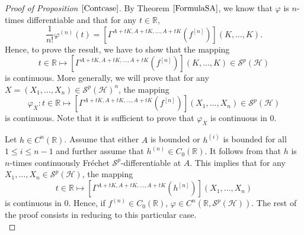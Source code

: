 \documentclass[12pt]{amsart}
\theoremstyle{remark}
\renewcommand{\H}{\mbox{${\mathcal H}$}}
\def\Sc{{\mathcal{S}}}
\begin{document}
\begin{proof}[Proof of Proposition $\ref{Contcase}$]
By Theorem $\ref{FormulaSA}$, we know that $\varphi$ is $n$-times differentiable and that for any $t\in \mathbb{R}$,
\begin{equation*}
\dfrac{1}{n!} \varphi^{(n)}(t) = \left[ \Gamma^{A+tK, A+tK, \ldots, A+tK}(f^{[n]}) \right] (K, \ldots, K).
\end{equation*}
Hence, to prove the result, we have to show that the mapping
$$
t \in \mathbb{R} \mapsto \left[ \Gamma^{A+tK, A+tK, \ldots, A+tK}(f^{[n]}) \right] (K, \ldots, K) \in \mathcal{S}^p(\mathcal{H})
$$
is continuous. More generally, we will prove that for any $X = (X_1, \ldots, X_n) \in \mathcal{S}^p(\mathcal{H})^n$, the mapping
$$
\varphi_X : t \in \mathbb{R} \mapsto \left[ \Gamma^{A+tK, A+tK, \ldots, A+tK}(f^{[n]}) \right] (X_1, \ldots, X_n) \in \mathcal{S}^p(\mathcal{H})
$$
is continuous. Note that it is sufficient to prove that $\varphi_X$ is continuous in $0$.

Let $h \in C^n(\mathbb{R})$.  Assume that either $A$ is bounded or $h^{(i)}$ is bounded for all $1\leq i\leq n-1$ and further assume that $h^{(n)} \in C_0(\mathbb{R})$. It follows from \cite[Theorem 3.4]{LMS} that $h$ is $n$-times continuously Fr\'echet $\mathcal{S}^p$-differentiable at $A$. This implies that for any $X_1, \ldots, X_n \in \mathcal{S}^p(\mathcal{H})$, the mapping
\begin{equation}\label{casefnC0}
t\in \mathbb{R} \mapsto \left[ \Gamma^{A+tK, A+tK, \ldots, A+tK}(h^{[n]}) \right] (X_1, \ldots, X_n)
\end{equation}
is continuous in $0$. Hence, if $f^{(n)} \in C_0(\mathbb{R})$, $\varphi \in C^n(\mathbb{R},\Sc^p(\H))$. The rest of the proof consists in reducing to this particular case.\\


\end{proof}
\end{document}
